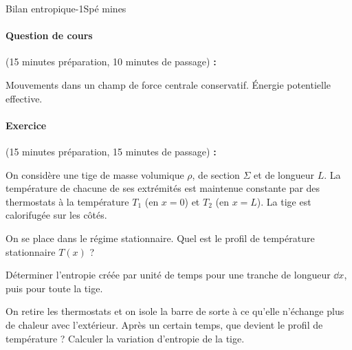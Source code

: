 \begin{exercise}{Bilan entropique}{-1}{Spé}
{}{mines}

\paragraph{Question de cours} \textsf{(15 minutes préparation, 10 minutes de passage) \textbf{:}}

Mouvements dans un champ de force centrale conservatif. Énergie potentielle effective.

\paragraph{Exercice} \textsf{(15 minutes préparation, 15 minutes de passage) \textbf{:}}

On considère une tige de masse volumique $\rho$, de section $\Sigma$ et de longueur $L$. La température de chacune de ses extrémités est maintenue constante par des thermostats à la température $T_1$ (en $x=0$) et $T_2$ (en $x=L$). La tige est calorifugée sur les côtés.

\begin{questions}
\question On se place dans le régime stationnaire. Quel est le profil de température stationnaire $T(x)$ ?

\question Déterminer l'entropie créée par unité de temps pour une tranche de longueur $\dd{x}$, puis pour toute la tige.

\question On retire les thermostats et on isole la barre de sorte à ce qu'elle n'échange plus de chaleur avec l'extérieur. Après un certain temps, que devient le profil de température ? Calculer la variation d'entropie de la tige.
\end{questions}

\end{exercise}
